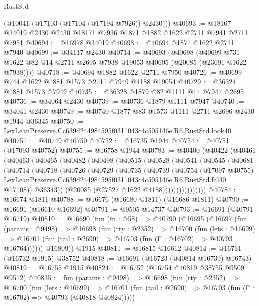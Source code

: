 \begin{lexlean}{RustStd}
\begin{coremodule}
      (@10041 (@17103 (@17104 (@17194 @7926)) @2430)))
@40693 := @18167 @34019 @2430 @2430 @18171 @7936 @1871 @1882 @1622 @2711 @7941 @2711 @7951
@40694 := @16978 @34019
@40698 := @40694 @1871 @1622 @2711 @7940
@40699 := @34117 @2430
@40714 := @40693
    (@40698
      (@40699 @731 @1622 @82 @14 @2711 @2695 @7938 @19053 @40605 (@20085 (@23691 @1622 @7938))))
@40718 := @40694 @1882 @1622 @2711 @7950
@40726 := @40699 @744 @1622 @1881 @1573 @2711 @7949 @4188 @19054
@40729 := @36324 @1881 @1573 @7949
@40735 := @36328 @1879 @82 @1111 @14 @7947 @2695
@40736 := @34064 @2430
@40739 := @40736 @1879 @1111 @7947
@40740 := @34041 @2430
@40749 := @40740 @1877 @83 @1573 @1111 @2711 @2696 @2430 @1944 @36345
@40750 := LexLeanPreserve.Cc639d244984595f0311043c4c505146e.R6.RustStd.look40
@40751 := @40749 @40750
@40752 := @16735 @1944
@40754 := @40751 (@17093 @40752)
@40755 := @16758 @1944
@40783 := @40400
    (@40422
      (@40461
        (@40463
          (@40465
            (@40482
              (@40498
                (@40515
                  (@40528
                    (@40541
                      (@40545
                        (@40681
                          (@40714
                            (@40718
                              (@40726
                                (@40729
                                  (@40735
                                    (@40739
                                      (@40754
                                        (@17097 @40755)
                                        LexLeanPreserve.Cc639d244984595f0311043c4c505146e.R6.RustStd.fal40
                                        @17108))
                                    @36343))
                                (@20085 (@27527 @1622 @4188))))))))))))))))
@40784 := @16674 @1811
@40788 := @16676 (@16680 @1811) (@16686 @1811)
@40790 := @16691 (@16610 @16692)
@40791 := @9505 @14737
@40793 := @16691 (@40791 @16719)
@40810 := @16690
    (fun (fn : @58) =>
    @40790
      (@16695
        (@16697
          (fun (params : @9498) =>
          @16698
            (fun (rty : @2352) =>
            @16700
              (fun (lets : @16699) =>
              @16701 (fun (tail : @2690) => @16703 (fun (Γ : @16702) => @40793 @16764))))))
        @16809))
    @1915
@40811 := @16815 @16612
@40814 := @16731 (@16732 @1915) @38752
@40818 := @16691 (@16723 (@40814 @16739) @16743)
@40819 := @16755 @1915
@40824 := @16752 (@16754 @40819 @38755 @9509 @9512)
@40835 := fun (params : @9498) =>
  @16698
    (fun (rty : @2352) =>
    @16700
      (fun (lets : @16699) =>
      @16701 (fun (tail : @2690) => @16703 (fun (Γ : @16702) => @40793 (@40818 @40824)))))

\end{coremodule}
\end{lexlean}
